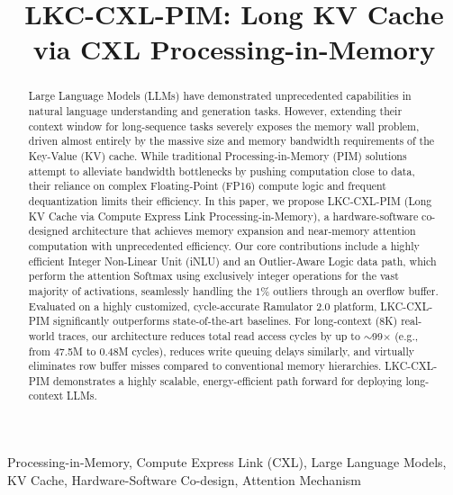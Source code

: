 \documentclass[10pt,conference]{IEEEtran}
\begin{document}
\title{LKC-CXL-PIM: Long KV Cache via CXL Processing-in-Memory}

\author{
}

\maketitle

\begin{abstract}
Large Language Models (LLMs) have demonstrated unprecedented capabilities in natural language understanding and generation tasks. However, extending their context window for long-sequence tasks severely exposes the memory wall problem, driven almost entirely by the massive size and memory bandwidth requirements of the Key-Value (KV) cache. While traditional Processing-in-Memory (PIM) solutions attempt to alleviate bandwidth bottlenecks by pushing computation close to data, their reliance on complex Floating-Point (FP16) compute logic and frequent dequantization limits their efficiency. In this paper, we propose LKC-CXL-PIM (Long KV Cache via Compute Express Link Processing-in-Memory), a hardware-software co-designed architecture that achieves memory expansion and near-memory attention computation with unprecedented efficiency. Our core contributions include a highly efficient Integer Non-Linear Unit (iNLU) and an Outlier-Aware Logic data path, which perform the attention Softmax using exclusively integer operations for the vast majority of activations, seamlessly handling the $1\%$ outliers through an overflow buffer. Evaluated on a highly customized, cycle-accurate Ramulator 2.0 platform, LKC-CXL-PIM significantly outperforms state-of-the-art baselines. For long-context (8K) real-world traces, our architecture reduces total read access cycles by up to $\sim$99$\times$ (e.g., from 47.5M to 0.48M cycles), reduces write queuing delays similarly, and virtually eliminates row buffer misses compared to conventional memory hierarchies. LKC-CXL-PIM demonstrates a highly scalable, energy-efficient path forward for deploying long-context LLMs.
\end{abstract}

\begin{IEEEkeywords}
Processing-in-Memory, Compute Express Link (CXL), Large Language Models, KV Cache, Hardware-Software Co-design, Attention Mechanism
\end{IEEEkeywords}
\end{document}
